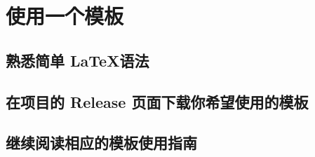 \section{使用一个模板}

\subsection{熟悉简单 \LaTeX 语法}
\subsection{在项目的 Release 页面下载你希望使用的模板}
\subsection{继续阅读相应的模板使用指南}
